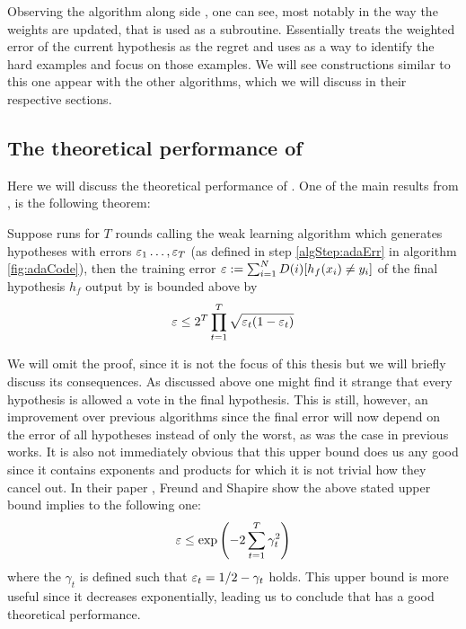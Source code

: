 Observing the \hedge\cite{Freund1997} algorithm along side \adaB, one can see, most notably in the way the weights are updated, that \hedge is used as a subroutine. Essentially \adaB treats the weighted error of the current hypothesis as the regret and uses \hedge as a way to identify the hard examples and focus \weak on those examples. We will see constructions similar to this one appear with the other algorithms, which we will discuss in their respective sections.
\subsection{The theoretical performance of \adaB}
\label{subsec:AdaTheoPerf}
Here we will discuss the theoretical performance of \adaB. One of the main results from \cite{Freund1997}, is the following theorem: 
\begin{theorem}\label{thm:adaErr}\cite{Freund1997}
Suppose \adaB runs for $T$ rounds calling the weak learning algorithm \weak which generates hypotheses with errors $\varepsilon_1\ldots, \varepsilon_T$ (as defined in step \ref{algStep:adaErr} in algorithm \ref{fig:adaCode}), then the training error $\varepsilon:=\sum_{i=1}^ND(i)[h_f(x_i)\neq y_i]$ of the final hypothesis $h_f$ output by \adaB is bounded above by $$\varepsilon\leq 2^T\prod^T_{t=1}\sqrt{\varepsilon_t(1-\varepsilon_t)}$$
\end{theorem}
We will omit the proof, since it is not the focus of this thesis but we will briefly discuss its consequences. As discussed above one might find it strange that every hypothesis is allowed a vote in the final hypothesis. This is still, however, an improvement over previous algorithms since the final error will now depend on the error of all hypotheses instead of only the worst, as was the case in previous works. It is also not immediately obvious that this upper bound does us any good since it contains exponents and products for which it is not trivial how they cancel out. In their paper \cite{Freund1997}, Freund and Shapire show the above stated upper bound  implies to the following one: $$\varepsilon\leq \exp\left(-2\sum^T_{t=1}\gamma_t^2\right)$$ where the $\gamma_t$ is defined such that $\varepsilon_t=1/2-\gamma_t$ holds. This upper bound is more useful since it decreases exponentially, leading us to conclude that \adaB has a good theoretical performance.   


\section{\NHB}
\label{sec:NHB}
